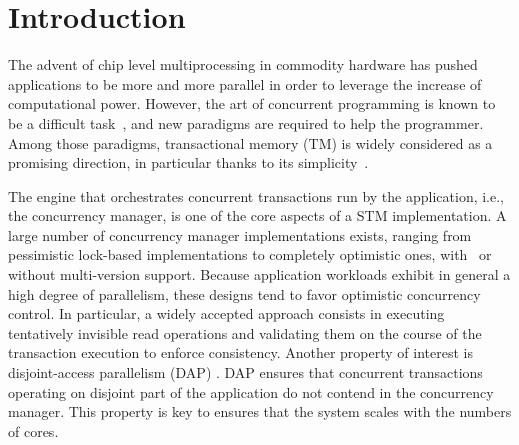 \section{Introduction}

The advent of chip level multiprocessing in commodity hardware has pushed applications to be more and more parallel in order to leverage the increase of computational power.
However, the art of concurrent programming is known to be a difficult task~\cite{Lee:2006:PT:1137232.1137289}, and new paradigms are required to help the programmer.
Among those paradigms, transactional memory (TM) is widely considered as a promising direction, in particular thanks to its simplicity~\cite{Dragojevic:2011:WSM:1924421.1924440}.

The engine that orchestrates concurrent transactions run by the application, i.e., the concurrency manager, is one of the core aspects of a STM implementation.
A large number of concurrency manager implementations exists, ranging from pessimistic lock-based implementations to completely optimistic ones, with~\cite{perelman2011smv} or without multi-version support.
Because application workloads exhibit in general a high degree of parallelism, these designs tend to favor optimistic concurrency control.
In particular, a widely accepted approach consists in executing tentatively invisible read operations and validating them on the course of the transaction execution to enforce consistency.
Another property of interest is disjoint-access parallelism (DAP) \cite{}.
DAP ensures that concurrent transactions operating on disjoint part of the application do not contend in the concurrency manager.
This property is key to ensures that the system scales with the numbers of cores.


